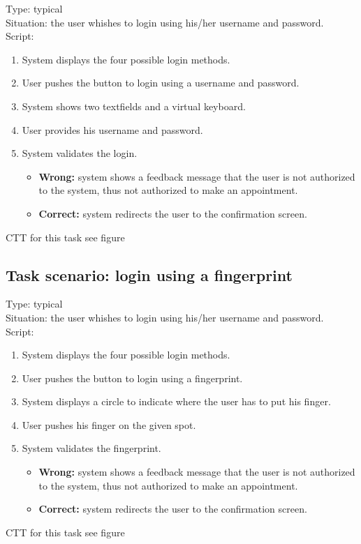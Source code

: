 \documentclass[11pt, a4paper,svglistings]{report}
\begin{document}
Type: typical \\
Situation: the user whishes to login using his/her username and password. \\
Script:
\begin{enumerate}
\item System displays the four possible login methods.
\item User pushes the button to login using a username and password.
\item System shows two textfields and a virtual keyboard.
\item User provides his username and password.
\item System validates the login.
\begin{itemize}
\item \textbf{Wrong:} system shows a feedback message that the user is not authorized to the system, thus not authorized to make an appointment.
\item \textbf{Correct:} system redirects the user to the  confirmation screen.
\end{itemize}
\end{enumerate}
CTT for this task see figure %

\subsection{Task scenario: login using a fingerprint}

Type: typical \\
Situation: the user whishes to login using his/her username and password. \\
Script:
\begin{enumerate}
\item System displays the four possible login methods.
\item User pushes the button to login using a fingerprint.
\item System displays a circle to indicate where the user has to put his finger.
\item User pushes his finger on the given spot.
\item System validates the fingerprint.
\begin{itemize}
\item \textbf{Wrong:} system shows a feedback message that the user is not authorized to the system, thus not authorized to make an appointment.
\item \textbf{Correct:} system redirects the user to the  confirmation screen.
\end{itemize}
\end{enumerate}
CTT for this task see figure %
\end{document}

